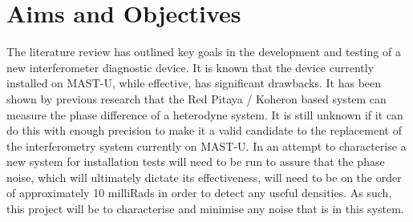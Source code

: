 \documentclass[12pt,a4paper,oneside]{report}
\begin{document}

	\chapter{Aims and Objectives}
The literature review has outlined key goals in the development and testing of a new interferometer diagnostic device. It is known that the device currently installed on MAST-U, while effective, has significant drawbacks. It has been shown by previous research \cite{Hickling2017InvestigationMAST-U} that the Red Pitaya / Koheron based system can measure the phase difference of a heterodyne system. It is still unknown if it can do this with enough precision to make it a valid candidate to the replacement of the interferometry system currently on MAST-U. In an attempt to characterise a new system for installation tests will need to be run to assure that the phase noise, which will ultimately dictate its effectiveness, will need to be on the order of approximately 10 milliRads in order to detect any useful densities. As such, this project will be to characterise and minimise any noise that is in this system. \\
\end{document}
